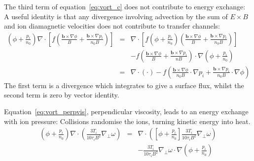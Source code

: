 \documentclass[12pt,a4paper]{article}
\begin{document}
The third term of equation~\ref{eq:vort_c} does not contribute to energy exchange: A useful identity is that any divergence involving advection by the sum of $E\times B$ and ion diamagnetic velocities does not contribute to transfer channels:
\begin{eqnarray*}
  \left(\phi + \frac{p_i}{n_0}\right)\nabla\cdot\left[f\left(\frac{\mathbf{b}\times\nabla\phi}{B} + \frac{\mathbf{b}\times\nabla p_i}{n_0B}\right)\right] &=& \nabla\cdot\left[f\left(\phi + \frac{p_i}{n_0}\right)\left(\frac{\mathbf{b}\times\nabla\phi}{B} + \frac{\mathbf{b}\times\nabla p_i}{n_0B}\right)\right] \\
  && - f\left(\frac{\mathbf{b}\times\nabla\phi}{B} + \frac{\mathbf{b}\times\nabla p_i}{nB}\right) \cdot \nabla\left(\phi + \frac{p_i}{n_0}\right) \\
  &=& \nabla\cdot\left(\cdot\right) - f\left(\frac{\mathbf{b}\times\nabla\phi}{n_0B}\cdot\nabla p_i + \frac{\mathbf{b}\times\nabla p_i}{n_0B}\cdot\nabla\phi\right)
\end{eqnarray*}
The first term is a divergence which integrates to give a surface flux, whilst the second term is zero by vector identity. 

Equation~\ref{eq:vort_perpvis}, perpendicular viscosity, leads
to an energy exchange with ion pressure: Collisions randomise the ions, turning kinetic energy into heat.
\begin{eqnarray}
  \left(\phi + \frac{p_i}{n_0}\right)\nabla\cdot\left(\frac{3T_i}{10\tau_iB^2}\nabla_\perp\omega\right) &=& \nabla\cdot\left(\left[\phi + \frac{p_i}{n_0}\right]\frac{3T_i}{10\tau_iB^2}\nabla_\perp\omega\right) \nonumber \\
  &&- \frac{3T_i}{10\tau_iB^2}\nabla_\perp\omega\cdot\nabla\left(\phi + \frac{p_i}{n_0}\right)
\end{eqnarray}
\end{document}
